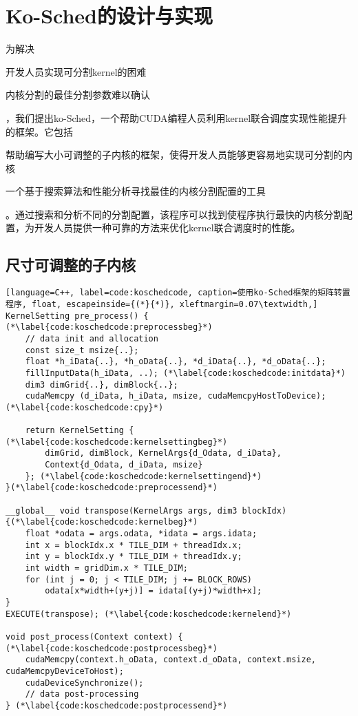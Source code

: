 \chapter{Ko-Sched的设计与实现}\label{chapter:design-implementation}

为解决
\begin{enumerate*}[label=\roman*),itemjoin={\quad}]
    \item 开发人员实现可分割kernel的困难
    \item 内核分割的最佳分割参数难以确认
\end{enumerate*}
，我们提出ko-Sched，一个帮助CUDA编程人员利用kernel联合调度实现性能提升的框架。它包括
\begin{enumerate*}[label=\roman*),itemjoin={\quad}]
    \item 帮助编写大小可调整的子内核的框架，使得开发人员能够更容易地实现可分割的内核
    \item 一个基于搜索算法和性能分析寻找最佳的内核分割配置的工具
\end{enumerate*}
。通过搜索和分析不同的分割配置，该程序可以找到使程序执行最快的内核分割配置，为开发人员提供一种可靠的方法来优化kernel联合调度时的性能。

\section{尺寸可调整的子内核}

\begin{lstlisting}[language=C++, label=code:koschedcode, caption=使用ko-Sched框架的矩阵转置程序, float, escapeinside={(*}{*)}, xleftmargin=0.07\textwidth,]
KernelSetting pre_process() { (*\label{code:koschedcode:preprocessbeg}*)
    // data init and allocation
    const size_t msize{..};
    float *h_iData{..}, *h_oData{..}, *d_iData{..}, *d_oData{..};
    fillInputData(h_iData, ..); (*\label{code:koschedcode:initdata}*)
    dim3 dimGrid{..}, dimBlock{..};
    cudaMemcpy (d_iData, h_iData, msize, cudaMemcpyHostToDevice); (*\label{code:koschedcode:cpy}*)

    return KernelSetting { (*\label{code:koschedcode:kernelsettingbeg}*)
        dimGrid, dimBlock, KernelArgs{d_Odata, d_iData}, 
        Context{d_Odata, d_iData, msize}
    }; (*\label{code:koschedcode:kernelsettingend}*)
}(*\label{code:koschedcode:preprocessend}*)

__global__ void transpose(KernelArgs args, dim3 blockIdx){(*\label{code:koschedcode:kernelbeg}*)
    float *odata = args.odata, *idata = args.idata;
    int x = blockIdx.x * TILE_DIM + threadIdx.x;
    int y = blockIdx.y * TILE_DIM + threadIdx.y;
    int width = gridDim.x * TILE_DIM;
    for (int j = 0; j < TILE_DIM; j += BLOCK_ROWS)
        odata[x*width+(y+j)] = idata[(y+j)*width+x];
}
EXECUTE(transpose); (*\label{code:koschedcode:kernelend}*)

void post_process(Context context) { (*\label{code:koschedcode:postprocessbeg}*)
    cudaMemcpy(context.h_oData, context.d_oData, context.msize, cudaMemcpyDeviceToHost);
    cudaDeviceSynchronize();
    // data post-processing
} (*\label{code:koschedcode:postprocessend}*)
\end{lstlisting}

